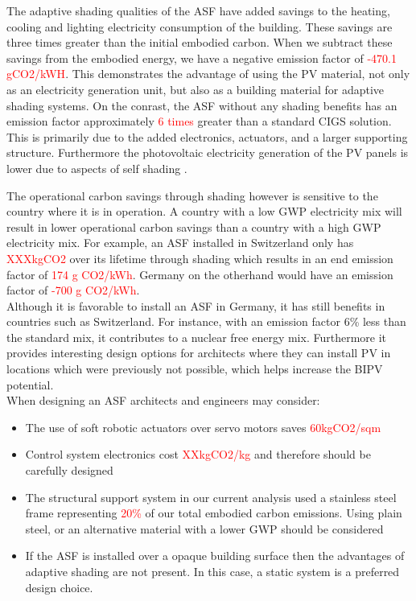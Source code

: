 
The adaptive shading qualities of the ASF have added savings to the heating, cooling and lighting electricity consumption of the building. These savings are three times greater than the initial embodied carbon. When we subtract these savings from the embodied energy, we have a negative emission factor of \textcolor{red}{-470.1 gCO2/kWH}. This demonstrates the advantage of using the PV material, not only as an electricity generation unit, but also as a building material for adaptive shading systems. On the conrast, the ASF without any shading benefits has an emission factor approximately \textcolor{red}{6 times } greater than a standard CIGS solution. This is primarily due to the added electronics, actuators, and a larger supporting structure. Furthermore the photovoltaic electricity generation of the PV panels is lower due to aspects of self shading \cite{hofer2015photovoltaics}. 

The operational carbon savings through shading however is sensitive to the country where it is in operation. A country with a low GWP electricity mix will result in lower operational carbon savings than a country with a high GWP electricity mix. For example, an ASF installed in Switzerland only has \textcolor{red}{XXXkgCO2} over its lifetime through shading which results in an end emission factor of \textcolor{red}{174 g CO2/kWh}. Germany on the otherhand would have an emission factor of \textcolor{red}{-700 g CO2/kWh}.\\

Although it is favorable to install an ASF in Germany, it has still benefits in countries such as Switzerland. For instance, with an emission factor 6\% less than the standard mix, it contributes to a nuclear free energy mix. Furthermore it provides interesting design options for architects where they can install PV in locations which were previously not possible, which helps increase the BIPV potential.  \\

When designing an ASF architects and engineers may consider: 
\begin{itemize}
\item The use of soft robotic actuators over servo motors saves \textcolor{red}{60kgCO2/sqm}
\item Control system electronics cost \textcolor{red}{XXkgCO2/kg} and therefore should be carefully designed
\item The structural support system in our current analysis used a stainless steel frame representing \textcolor{red}{20\%} of our total embodied carbon emissions. Using plain steel, or an alternative material with a lower GWP should be considered
\item If the ASF is installed over a opaque building surface then the advantages of adaptive shading are not present. In this case, a static system is a preferred design choice. 
\end{itemize}


